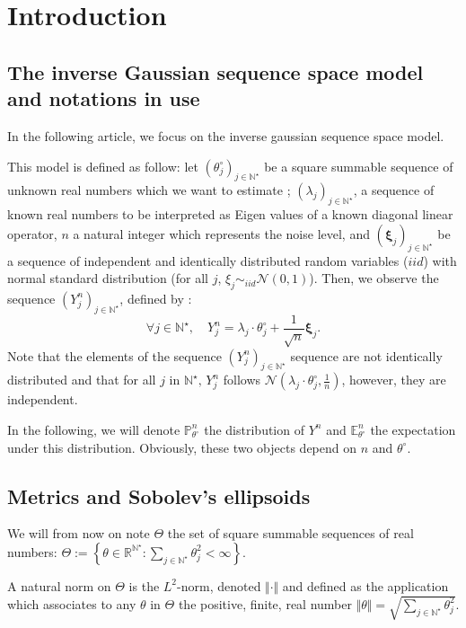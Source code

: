 \section{Introduction}\label{1}
\subsection{The inverse Gaussian sequence space model and notations in use}\label{1.1}

In the following article, we focus on the inverse gaussian sequence space model.

This model is defined as follow: let $\left(\theta^{\circ}_{j}\right)_{j \in \mathds{N}^{\star}}$ be a square summable sequence of unknown real numbers which we want to estimate ; $\left(\lambda_{j}\right)_{j \in \mathds{N}^{\star}}$, a sequence of known real numbers to be interpreted as Eigen values of a known diagonal linear operator, $n$ a natural integer which represents the noise level, and $(\boldsymbol{\xi}_{j})_{j \in \mathds{N}^{\star}}$ be a sequence of independent and identically distributed random variables ($iid$) with normal standard distribution (for all $j$, $\xi_{j} \sim_{iid} \mathcal{N}(0,1)$).
Then, we observe the sequence $\left(Y^{n}_{j}\right)_{j \in \mathds{N}^{\star}}$, defined by :
\[\forall j \in \mathds{N}^{\star}, \quad Y_{j}^{n} = \lambda_{j} \cdot \theta^{\circ}_{j} + \frac{1}{\sqrt{n}} \boldsymbol{\xi}_{j}.\]
Note that the elements of the sequence $\left(Y_{j}^{n}\right)_{j \in \mathds{N}^{\star}}$ sequence are not identically distributed and that for all $j$ in $\mathds{N}^{\star}, \, Y_{j}^{n}$ follows $\mathcal{N}(\lambda_{j} \cdot \theta^{\circ}_{j}, \frac{1}{n})$, however, they are independent.

In the following, we will denote $\mathds{P}_{\theta^{\circ}}^{n}$ the distribution of $Y^{n}$ and $\mathds{E}_{\theta^{\circ}}^{n}$ the expectation under this distribution.
Obviously, these two objects depend on $n$ and $\theta^{\circ}.$

\subsection{Metrics and Sobolev's ellipsoids}\label{1.2}

We will from now on note $\Theta$ the set of square summable sequences of real numbers: $\Theta := \left\{\theta \in \mathds{R}^{\mathds{N}^{\star}}: \sum\limits_{j \in \mathds{N}^{\star}} \theta_{j}^{2} < \infty \right\}$.

A natural norm on $\Theta$ is the $L^{2}$-norm, denoted $\Vert \cdot \Vert$ and defined as the application which associates to any $\theta$ in $\Theta$ the positive, finite, real number $\Vert \theta \Vert = \sqrt{\sum\limits_{j \in \mathds{N}^{\star}} \theta_{j}^{2}}$.

